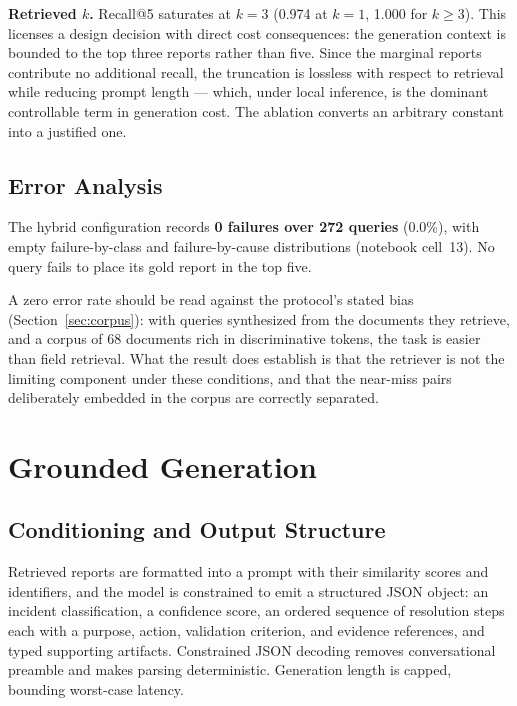 \documentclass[12pt, a4paper]{article}
\begin{document}
\textbf{Retrieved $k$.} Recall@5 saturates at $k = 3$ (0.974 at $k=1$, 1.000 for $k \geq 3$). This licenses a design decision with direct cost consequences: the generation context is bounded to the top three reports rather than five. Since the marginal reports contribute no additional recall, the truncation is lossless with respect to retrieval while reducing prompt length — which, under local inference, is the dominant controllable term in generation cost. The ablation converts an arbitrary constant into a justified one.

\subsection{Error Analysis}

The hybrid configuration records \textbf{0 failures over 272 queries} (0.0\%), with empty failure-by-class and failure-by-cause distributions (notebook cell~13). No query fails to place its gold report in the top five.

A zero error rate should be read against the protocol's stated bias (Section~\ref{sec:corpus}): with queries synthesized from the documents they retrieve, and a corpus of 68 documents rich in discriminative tokens, the task is easier than field retrieval. What the result does establish is that the retriever is not the limiting component under these conditions, and that the near-miss pairs deliberately embedded in the corpus are correctly separated.

\section{Grounded Generation}
\label{sec:generation}

\subsection{Conditioning and Output Structure}

Retrieved reports are formatted into a prompt with their similarity scores and identifiers, and the model is constrained to emit a structured JSON object: an incident classification, a confidence score, an ordered sequence of resolution steps each with a purpose, action, validation criterion, and evidence references, and typed supporting artifacts. Constrained JSON decoding removes conversational preamble and makes parsing deterministic. Generation length is capped, bounding worst-case latency.
\end{document}
